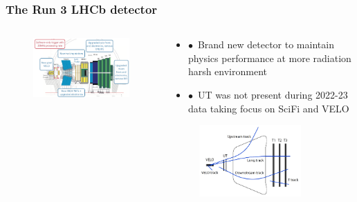 \documentclass[aspectratio=1610, 12pt, xcolor=dvipsnames]{beamer}
\begin{document}
\begin{frame}\frametitle{The Run 3 LHCb detector}
  \begin{columns}
    \begin{column}[c]{0.6\textwidth}
      \begin{figure}
        \includegraphics[width=\textwidth]{plots/lhcb_upgrade.png}
      \end{figure}
    \end{column}
    \begin{column}{0.48\textwidth}
      \begin{itemize}
        \item $\bullet$\, Brand new detector to maintain physics performance at more radiation harsh environment
        \item $\bullet$\, UT was not present during 2022-23 data taking \to focus on SciFi and VELO
      \end{itemize}
      \begin{figure}
        \centering
        \includegraphics[width=0.8\textwidth]{track.png}

\end{figure}
\end{column}
\end{columns}
\end{frame}
\end{document}
